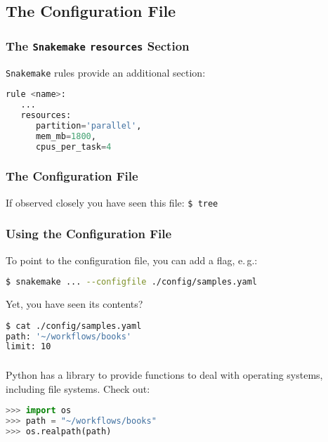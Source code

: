 \subsection{The Configuration File}

\begin{frame}[fragile]
  \frametitle{The \texttt{Snakemake} \texttt{resources} Section}
  \texttt{Snakemake} rules provide an additional  section:
  \begin{lstlisting}[language=Python,style=Python]
rule <name>:
   ...
   resources:
      partition='parallel',
      mem_mb=1800,
      cpus_per_task=4
  \end{lstlisting}
  \pause
\end{frame}

\begin{frame}
  \frametitle{The Configuration File}
  If observed closely you have seen this file:\newline
            {\tiny \DTsetlength{0.2em}{1em}{0.2em}{0.4pt}{.6pt}
\texttt{\$ tree}
}
 \pause
\end{frame}

\begin{frame}[fragile]
  \frametitle{Using the Configuration File}
  To point to the configuration file, you can add a flag, e.\,g.:
  \begin{lstlisting}[language=Bash, style=Shell]
$ snakemake ... --configfile ./config/samples.yaml  
  \end{lstlisting}
  Yet, you have seen its contents?
  \begin{lstlisting}[language=Bash, style=Shell]
$ cat ./config/samples.yaml
path: '~/workflows/books'
limit: 10
  \end{lstlisting}
\end{frame} 

\begin{frame}[fragile]
  \frametitle{}
  Python has a library to provide functions to deal with operating systems, including file systems. Check out:
  \begin{lstlisting}[language=Python,style=Python]
>>> import os
>>> path = "~/workflows/books"
>>> os.realpath(path)

  \end{lstlisting}

\end{frame}


